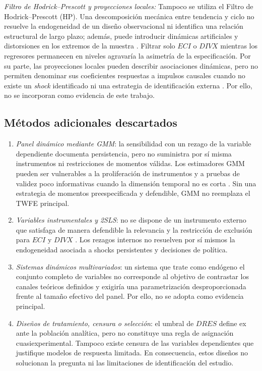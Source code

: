 \documentclass[../../TFM.tex]{subfiles}
\begin{document}
	\noindent\textit{Filtro de Hodrick--Prescott y proyecciones locales:} Tampoco se utiliza el
	Filtro de Hodrick--Prescott (HP). Una descomposición mecánica entre tendencia y ciclo no
	resuelve la endogeneidad de un diseño observacional ni identifica una relación
	estructural de largo plazo; además, puede introducir dinámicas artificiales y
	distorsiones en los extremos de la muestra \parencite{Hamilton2017}. Filtrar
	solo $ECI$ o $DIVX$ mientras los regresores permanecen en niveles agravaría la
	asimetría de la especificación. Por su parte, las proyecciones locales pueden
	describir asociaciones dinámicas, pero no permiten denominar sus coeficientes
	respuestas a impulsos causales cuando no existe un \textit{shock} identificado
	ni una estrategia de identificación externa \parencite{Jord2005}. Por ello,
	no se incorporan como evidencia de este trabajo.

	\subsection{Métodos adicionales descartados}

	\begin{enumerate}
		\item \textit{Panel dinámico mediante GMM}: la sensibilidad con un rezago
		de la variable dependiente documenta persistencia, pero no suministra por sí
		misma instrumentos ni restricciones de momentos válidas. Los estimadores GMM
		pueden ser vulnerables a la proliferación de instrumentos y a pruebas de
		validez poco informativas cuando la dimensión temporal no es corta
		\parencite{Roodman2009}. Sin una estrategia de momentos preespecificada y
		defendible, GMM no reemplaza el TWFE principal.
		\item \textit{Variables instrumentales y 2SLS}: no se dispone de un
		instrumento externo que satisfaga de manera defendible la relevancia y la
		restricción de exclusión para $ECI$ y $DIVX$
		\parencite{Angrist1996, Andrews2019}. Los
		rezagos internos no resuelven por sí mismos la endogeneidad asociada a
		shocks persistentes y decisiones de política.
		\item \textit{Sistemas dinámicos multivariados}: un sistema que trate como
		endógeno el conjunto completo de variables no corresponde al objetivo de
		contrastar los canales teóricos definidos y exigiría una parametrización
		desproporcionada frente al tamaño efectivo del panel. Por ello, no se adopta
		como evidencia principal.
		\item \textit{Diseños de tratamiento, censura o selección}: el umbral de
		$DRES$ define ex ante la población analítica, pero no constituye una regla
		de asignación cuasiexperimental. Tampoco existe censura de las variables
		dependientes que justifique modelos de respuesta limitada. En consecuencia,
		estos diseños no solucionan la pregunta ni las limitaciones de identificación
		del estudio.
	\end{enumerate}



\end{document}
